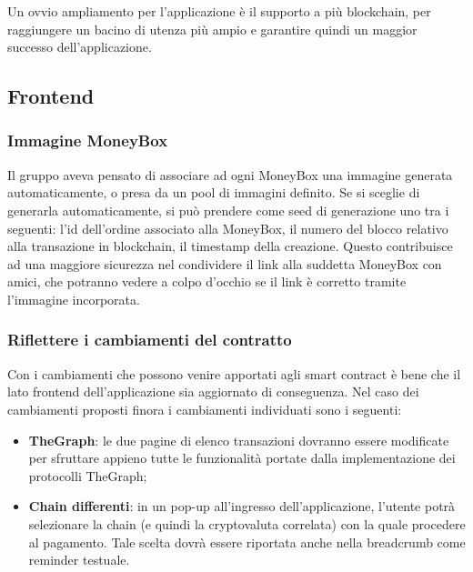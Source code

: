 Un ovvio ampliamento per l'applicazione è il supporto a più blockchain, per raggiungere un bacino di utenza più ampio e garantire quindi un maggior successo dell'applicazione.\\


\subsection{Frontend}

\subsubsection{Immagine MoneyBox}

Il gruppo aveva pensato di associare ad ogni MoneyBox una immagine generata automaticamente, o presa da un pool di immagini definito. Se si sceglie di generarla automaticamente, si può prendere come seed di generazione uno tra i seguenti: l'id dell'ordine associato alla MoneyBox, 
il numero del blocco relativo alla transazione in blockchain, il timestamp della creazione.
Questo contribuisce ad una maggiore sicurezza nel condividere il link alla suddetta MoneyBox con amici, che potranno vedere a colpo d'occhio se il link è corretto tramite l'immagine incorporata.

\subsubsection{Riflettere i cambiamenti del contratto}

Con i cambiamenti che possono venire apportati agli smart contract è bene che il lato frontend dell'applicazione sia aggiornato di conseguenza.
Nel caso dei cambiamenti proposti finora i cambiamenti individuati sono i seguenti:
\begin{itemize}
    \item \textbf{TheGraph}: le due pagine di elenco transazioni dovranno essere modificate per sfruttare appieno tutte le funzionalità portate dalla implementazione dei protocolli TheGraph;
    \item \textbf{Chain differenti}:  in un pop-up all'ingresso dell'applicazione, l'utente potrà selezionare la chain (e quindi la cryptovaluta correlata) con la quale procedere al pagamento. Tale scelta dovrà essere riportata anche nella breadcrumb come reminder testuale.
\end{itemize}

